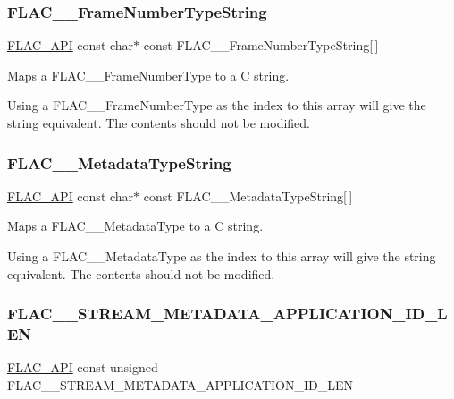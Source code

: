 \subsubsection{\texorpdfstring{FLAC\_\_FrameNumberTypeString}{FLAC\_\_FrameNumberTypeString}}
{\footnotesize\ttfamily \mbox{\hyperlink{group__flac__export_ga56ca07df8a23310707732b1c0007d6f5}{F\+L\+A\+C\+\_\+\+A\+PI}} const char$\ast$ const F\+L\+A\+C\+\_\+\+\_\+\+Frame\+Number\+Type\+String\mbox{[}$\,$\mbox{]}}

Maps a F\+L\+A\+C\+\_\+\+\_\+\+Frame\+Number\+Type to a C string.

Using a F\+L\+A\+C\+\_\+\+\_\+\+Frame\+Number\+Type as the index to this array will give the string equivalent. The contents should not be modified. \mbox{\label{group__flac__format_gaf1ee427883bf9ecc219c25834e89a0ee}} 
\subsubsection{\texorpdfstring{FLAC\_\_MetadataTypeString}{FLAC\_\_MetadataTypeString}}
{\footnotesize\ttfamily \mbox{\hyperlink{group__flac__export_ga56ca07df8a23310707732b1c0007d6f5}{F\+L\+A\+C\+\_\+\+A\+PI}} const char$\ast$ const F\+L\+A\+C\+\_\+\+\_\+\+Metadata\+Type\+String\mbox{[}$\,$\mbox{]}}

Maps a F\+L\+A\+C\+\_\+\+\_\+\+Metadata\+Type to a C string.

Using a F\+L\+A\+C\+\_\+\+\_\+\+Metadata\+Type as the index to this array will give the string equivalent. The contents should not be modified. \mbox{\label{group__flac__format_ga8a1d1839a9e22692dfeaf9fce9cb9991}} 
\subsubsection{\texorpdfstring{FLAC\_\_STREAM\_METADATA\_APPLICATION\_ID\_LEN}{FLAC\_\_STREAM\_METADATA\_APPLICATION\_ID\_LEN}}
{\footnotesize\ttfamily \mbox{\hyperlink{group__flac__export_ga56ca07df8a23310707732b1c0007d6f5}{F\+L\+A\+C\+\_\+\+A\+PI}} const unsigned F\+L\+A\+C\+\_\+\+\_\+\+S\+T\+R\+E\+A\+M\+\_\+\+M\+E\+T\+A\+D\+A\+T\+A\+\_\+\+A\+P\+P\+L\+I\+C\+A\+T\+I\+O\+N\+\_\+\+I\+D\+\_\+\+L\+EN}

